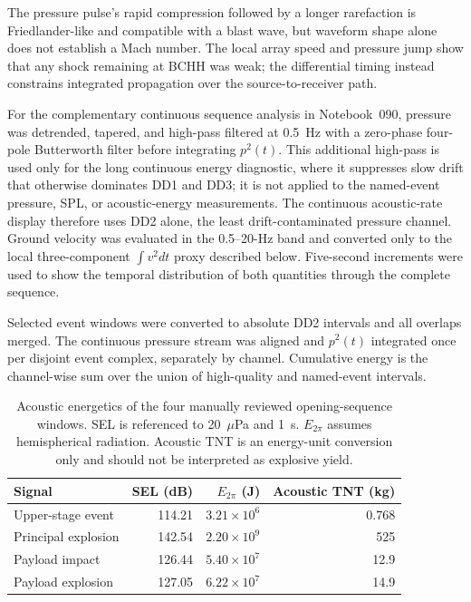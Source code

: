 \documentclass[]{seismica}
\begin{document}
The pressure pulse's rapid compression followed by a longer rarefaction is
Friedlander-like and compatible with a blast wave, but waveform shape alone
does not establish a Mach number. The local array speed and pressure jump show
that any shock remaining at BCHH was weak; the differential timing instead
constrains integrated propagation over the source-to-receiver path.

For the complementary continuous sequence analysis in Notebook~090,
pressure was detrended, tapered, and high-pass filtered at 0.5~Hz with a
zero-phase four-pole Butterworth filter before integrating $p^2(t)$. This
additional high-pass is used only for the long continuous energy diagnostic,
where it suppresses slow drift that otherwise dominates DD1 and DD3; it is not
applied to the named-event pressure, SPL, or acoustic-energy measurements.
The continuous acoustic-rate display therefore uses DD2 alone, the least
drift-contaminated pressure channel. Ground velocity was evaluated in the
0.5--20-Hz band and converted only to the local three-component
$\int v^2dt$ proxy described below. Five-second increments were used to show
the temporal distribution of both quantities through the complete sequence.

Selected event windows were converted to absolute DD2 intervals and all
overlaps merged. The continuous pressure stream was aligned and $p^2(t)$
integrated once per disjoint event complex, separately by channel. Cumulative
energy is the channel-wise sum over the union of high-quality and named-event
intervals.

\begin{table}[!tbp]
\centering
\small
\caption{Acoustic energetics of the four manually reviewed opening-sequence
windows. SEL is referenced to 20~$\mu$Pa and 1~s. $E_{2\pi}$ assumes
hemispherical radiation. Acoustic TNT is an energy-unit conversion only and
should not be interpreted as explosive yield.}
\label{tab:supp_energetics}
\begin{tabularx}{\textwidth}{Xrrr}
\hline
Signal & SEL (dB) & $E_{2\pi}$ (J) & Acoustic TNT (kg) \\
\hline
Upper-stage event   & 114.21 & $3.21\times10^6$ & 0.768 \\
Principal explosion & 142.54 & $2.20\times10^9$ & 525   \\
Payload impact      & 126.44 & $5.40\times10^7$ & 12.9  \\
Payload explosion   & 127.05 & $6.22\times10^7$ & 14.9  \\
\hline
\end{tabularx}
\end{table}
\end{document}
